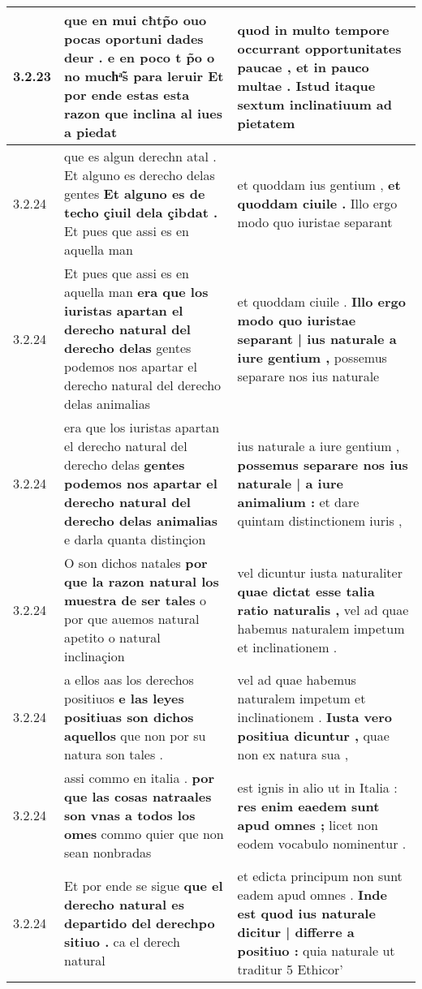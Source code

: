 \begin{tabular}{|p{1cm}|p{6.5cm}|p{6.5cm}|}
3.2.23 & que en mui cħtp̃o ouo pocas oportuni dades deur . \textbf{ e en poco t p̃o o no muchͣ̃s para leruir } Et por ende estas esta razon que inclina al iues a piedat & quod in multo tempore occurrant opportunitates paucae , \textbf{ et in pauco multae . } Istud itaque sextum inclinatiuum ad pietatem \\\hline
3.2.24 & que es algun derechn atal . Et alguno es derecho delas gentes \textbf{ Et alguno es de techo çiuil dela çibdat . } Et pues que assi es en aquella man & et quoddam ius gentium , \textbf{ et quoddam ciuile . } Illo ergo modo quo iuristae separant \\\hline
3.2.24 & Et pues que assi es en aquella man \textbf{ era que los iuristas apartan el derecho natural del derecho delas } gentes podemos nos apartar el derecho natural del derecho delas animalias & et quoddam ciuile . \textbf{ Illo ergo modo quo iuristae separant | ius naturale a iure gentium , } possemus separare nos ius naturale \\\hline
3.2.24 & era que los iuristas apartan el derecho natural del derecho delas \textbf{ gentes podemos nos apartar el derecho natural del derecho delas animalias } e darla quanta distinçion & ius naturale a iure gentium , \textbf{ possemus separare nos ius naturale | a iure animalium : } et dare quintam distinctionem iuris , \\\hline
3.2.24 & O son dichos natales \textbf{ por que la razon natural los muestra de ser tales } o por que auemos natural apetito o natural inclinaçion & vel dicuntur iusta naturaliter \textbf{ quae dictat esse talia ratio naturalis , } vel ad quae habemus naturalem impetum et inclinationem . \\\hline
3.2.24 & a ellos aas los derechos positiuos \textbf{ e las leyes positiuas son dichos aquellos } que non por su natura son tales . & vel ad quae habemus naturalem impetum et inclinationem . \textbf{ Iusta vero positiua dicuntur , } quae non ex natura sua , \\\hline
3.2.24 & assi commo en italia . \textbf{ por que las cosas natraales son vnas a todos los omes } commo quier que non sean nonbradas & est ignis in alio ut in Italia : \textbf{ res enim eaedem sunt apud omnes ; } licet non eodem vocabulo nominentur . \\\hline
3.2.24 & Et por ende se sigue \textbf{ que el derecho natural es departido del derechpo sitiuo . } ca el derech natural & et edicta principum non sunt eadem apud omnes . \textbf{ Inde est quod ius naturale dicitur | differre a positiuo : } quia naturale ut traditur 5 Ethicor’ \\\hline

\end{tabular}
